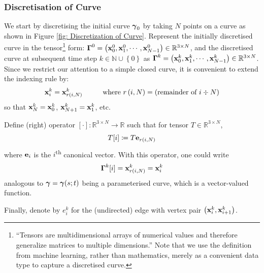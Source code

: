 \documentclass[../dissertation.tex]{subfiles}
\begin{document}
\subsubsection{Discretisation of Curve}
We start by discretising the initial curve $\boldsymbol{\gamma}_0$ by taking $N$ points on a curve as shown in Figure \ref{fig: Discretization of Curve}.
Represent the initially discretised curve in the tensor\footnote{``Tensors are multidimensional arrays of numerical values and therefore generalize matrices to multiple dimensions.''\cite{https://doi.org/10.48550/arxiv.1711.10781} Note that we use the definition from machine learning,
rather than mathematics, merely as a convenient data type to capture a discretised curve.}
form: $\boldsymbol{\Gamma}^0 = \left( \mathbf{x}_0^0, \mathbf{x}_1^0, \cdots, \mathbf{x}_{N-1}^0 \right) \in \mathbb{R}^{3 \times N}$,
and the discretised curve at subsequent time step $k \in \mathbb{N} \cup \left\{ 0 \right\}$ as $\boldsymbol{\Gamma}^k = \left( \mathbf{x}_0^k, \mathbf{x}_1^k, \cdots, \mathbf{x}_{N-1}^k \right) \in \mathbb{R}^{3 \times N}$.
Since we restrict our attention to a simple closed curve, it is convenient to extend the indexing rule by:
\begin{equation}
    \mathbf{x}_{i}^k = \mathbf{x}_{r\left( i,N \right)}^k \hspace{1cm} \text{where } r\left( i,N \right) = \text{(remainder of } i \div N \text{)}
\end{equation}
so that $\mathbf{x}_N^k = \mathbf{x}_{0}^k$, $\mathbf{x}_{N+1}^k = \mathbf{x}_{1}^k$, etc.

Define (right) operator $[\cdot]:\mathbb{R}^{3 \times N} \rightarrow \mathbb{R}$ such that for tensor $T \in \mathbb{R}^{3 \times N}$,
\begin{equation*}
    T[i] \coloneqq T \mathbf{e}_{r\left( i,N \right)}
\end{equation*}
where $\mathbf{e}_i$ is the $i$\textsuperscript{th} canonical vector.
With this operator, one could write
\begin{equation}
    \boldsymbol{\Gamma}^k [i] = \mathbf{x}_{r\left( i, N \right)}^k = \mathbf{x}_i^k
\end{equation}
analogous to $\boldsymbol{\gamma} = \boldsymbol{\gamma}(s;t)$ being a parameterised curve, which is a vector-valued function.

Finally, denote by $e_{i}^k$ for the (undirected) edge with vertex pair $\left( \mathbf{x}_i^k, \mathbf{x}_{i+1}^k \right)$.
\end{document}
